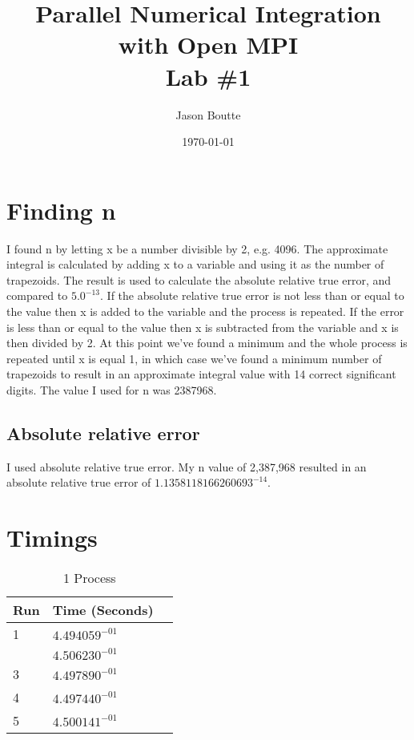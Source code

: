 \documentclass[table]{report}
\begin{document}
\title{Parallel Numerical Integration with Open MPI\\
Lab \#1}
\date{\today}
\author{Jason Boutte}
\maketitle

\section{Finding n}

I found n by letting x be a number divisible by 2, e.g. 4096. The approximate
integral is calculated by adding x to a variable and using it as the number
of trapezoids. The result is used to calculate the absolute relative true error,
and compared to $5.0^{-13}$. If the absolute relative true error is not less than
or equal to the value then x is added to the variable and the process is repeated.
If the error is less than or equal to the value then x is subtracted from the 
variable and x is then divided by 2. At this point we've found a minimum and the 
whole process is repeated until x is equal 1, in which case we've found a minimum 
number of trapezoids to result in an approximate integral value with 14 correct 
significant digits. The value I used for n was 2387968.

\subsection{Absolute relative error}

I used absolute relative true error. My n value of 2,387,968 resulted in an
absolute relative true error of $1.1358118166260693^{-14}$.

\section{Timings}

\begin{table}[h!]
\centering
	\begin{tabular}{|l|l|l}
	\hline
	Run & Time (Seconds) \\ \hline
	1 & $4.494059^{-01}$ \\ \hline
	\hiderowcolors 2 & $4.506230^{-01}$ \\ \hline
	3 & $4.497890^{-01}$ \\ \hline
	4 & $4.497440^{-01}$ \\ \hline
	5 & $4.500141^{-01}$ \\ \hline
	\end{tabular}
	\caption{1 Process}
	\label{table:1}
\end{table}
\end{document}
